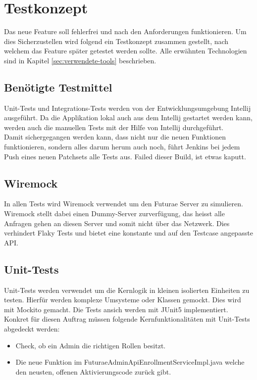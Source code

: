 \section{Testkonzept}
Das neue Feature soll fehlerfrei und nach den Anforderungen funktionieren. Um dies Sicherzustellen wird folgend ein Testkonzept zusammen gestellt, nach welchem das Feature später getestet werden sollte.
Alle erwähnten Technologien sind in Kapitel \ref{sec:verwendete-tools} beschrieben.


\subsection{Benötigte Testmittel}
Unit-Tests und Integrations-Tests werden von der Entwicklungsumgebung Intellij ausgeführt. Da die Applikation lokal auch aus dem Intellij gestartet werden kann, werden auch die manuellen Tests mit der Hilfe von Intellij durchgeführt.  \newline
\\
Damit sichergegangen werden kann, dass nicht nur die neuen Funktionen funktionieren, sondern alles darum herum auch noch, führt Jenkins bei jedem Push eines neuen Patchsets alle Tests aus. Failed dieser Build, ist etwas kaputt.

\subsection{Wiremock}
In allen Tests wird Wiremock verwendet um den Futurae Server zu simulieren. Wiremock stellt dabei einen Dummy-Server zurverfügung, das heisst alle Anfragen gehen an diesen Server und somit nicht über das Netzwerk. Dies verhindert Flaky Tests und bietet eine konstante und auf den Testcase angepasste API. 

\subsection{Unit-Tests}
Unit-Tests werden verwendet um die Kernlogik in kleinen isolierten Einheiten zu testen. Hierfür werden komplexe Umsysteme oder Klassen gemockt. Dies wird mit Mockito gemacht. Die Tests ansich werden mit JUnit5 implementiert. Konkret für diesen Auftrag müssen folgende Kernfunktionalitäten mit Unit-Tests abgedeckt werden:
\begin{itemize}
	\item Check, ob ein Admin die richtigen Rollen besitzt.
	\item Die neue Funktion im FuturaeAdminApiEnrollmentServiceImpl.java welche den neusten, offenen Aktivierungscode zurück gibt.	
\end{itemize}

